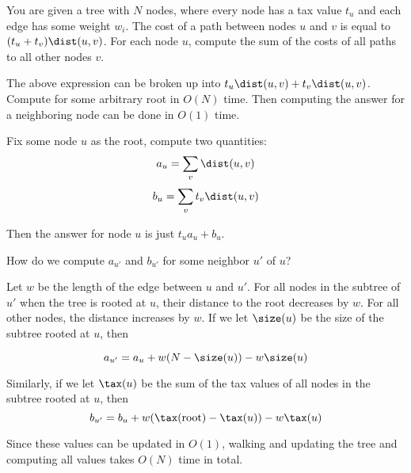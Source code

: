 
\noindent
        You are given a tree with $N$ nodes, where every node has a tax value
            $t_u$ and each edge has some weight $w_i$. The cost of a path
            between nodes $u$ and $v$ is equal to $(t_u + t_v) \dist(u, v)$.
            For each node $u$, compute the sum of the costs of all paths to
            all other nodes $v$.

        The above expression can be broken up into $t_u \dist(u, v) + t_v \dist(u, v)$. Compute for some arbitrary root
        in $O(N)$ time. Then computing the answer for a neighboring node can be done in $O(1)$ time.

        Fix some node $u$ as the root, compute two quantities:
            \[ a_u = \sum_v \dist(u, v) \]
            \[ b_u = \sum_v t_v \dist(u, v) \]

        Then the answer for node $u$ is just $t_u a_u + b_u$.

        How do we compute $a_{u'}$ and $b_{u'}$ for some neighbor $u'$ of $u$?

        Let $w$ be the length of the edge between $u$ and $u'$. For all
        nodes in the subtree of $u'$ when the tree is rooted at $u$, their
        distance to the root decreases by $w$. For all other nodes, the
        distance increases by $w$. If we let $\size(u)$ be the size of the subtree
        rooted at $u$, then

        \[ a_{u'} = a_u + w (N - \size(u)) - w \size(u) \]

        Similarly, if we let $\tax(u)$ be the sum of the tax values of all
        nodes in the subtree rooted at $u$, then
        \[ b_{u'} = b_u + w (\tax(\text{root}) - \tax(u)) - w \tax(u) \]

        Since these values can be updated in $O(1)$, walking and updating the
        tree and computing all values takes $O(N)$ time in total.

